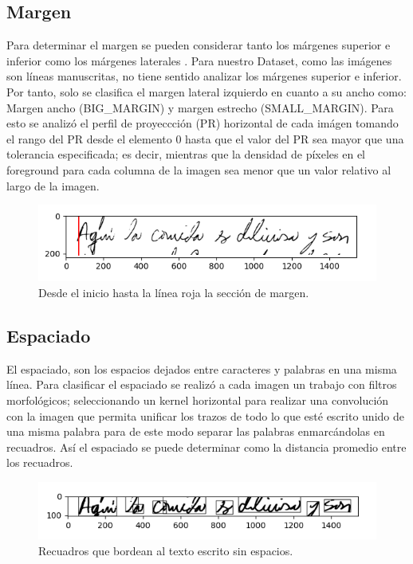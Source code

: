 \documentclass[10pt, a4paper]{article}
\begin{document}
        \subsection{Margen} 
        
            Para determinar el margen se pueden considerar tanto los m\'argenes superior e inferior como los m\'argenes laterales \cite{joshi2019machine}. Para nuestro Dataset, como las im\'agenes son l\'ineas manuscritas, no tiene sentido analizar los m\'argenes superior e inferior. Por tanto, solo 
            se clasifica el margen lateral izquierdo en cuanto a su ancho como: Margen ancho (BIG\_MARGIN) y margen estrecho (SMALL\_MARGIN). Para esto se analiz\'o el perfil de proyeccci\'on (PR) horizontal de cada im\'agen tomando el rango del PR desde el elemento 0 hasta que el valor del PR 
            sea mayor que una tolerancia especificada; es decir, mientras que la densidad de p\'ixeles en el foreground para cada columna de la imagen sea menor que un valor relativo al largo de la imagen. 

            \begin{figure}[!h]
                \centering
                \includegraphics[width = 0.5\linewidth]{Margin.png}
                \caption{Desde el inicio hasta la l\'inea roja la secci\'on de margen.}
            \end{figure}
        \subsection{Espaciado} 

            El espaciado, son los espacios dejados entre caracteres y palabras en una misma l\'inea. Para clasificar el espaciado se realiz\'o a cada imagen un trabajo con filtros morfol\'ogicos; seleccionando un kernel horizontal para realizar una convoluci\'on con la imagen 
            que permita unificar los trazos de todo lo que est\'e escrito unido de una misma palabra para de este modo separar las palabras enmarc\'andolas en recuadros. As\'i el espaciado se puede determinar como la distancia promedio entre los recuadros.

            \begin{figure}[!h]
                \centering
                \includegraphics[width = 0.5\linewidth]{Espaces.png}
                \caption{Recuadros que bordean al texto escrito sin espacios.}
            \end{figure}
\end{document}
